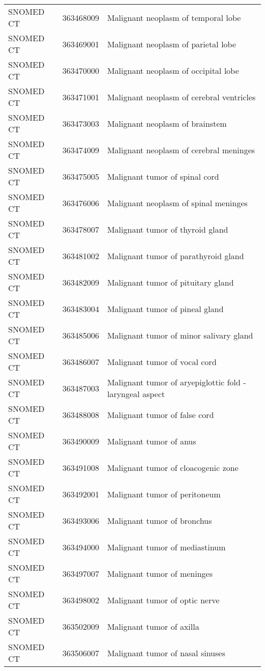 \begin{longtable}{p{}p{}p{}}
  SNOMED CT & 363468009 & Malignant neoplasm of temporal lobe \\ 
  SNOMED CT & 363469001 & Malignant neoplasm of parietal lobe \\ 
  SNOMED CT & 363470000 & Malignant neoplasm of occipital lobe \\ 
  SNOMED CT & 363471001 & Malignant neoplasm of cerebral ventricles \\ 
  SNOMED CT & 363473003 & Malignant neoplasm of brainstem \\ 
  SNOMED CT & 363474009 & Malignant neoplasm of cerebral meninges \\ 
  SNOMED CT & 363475005 & Malignant tumor of spinal cord \\ 
  SNOMED CT & 363476006 & Malignant neoplasm of spinal meninges \\ 
  SNOMED CT & 363478007 & Malignant tumor of thyroid gland \\ 
  SNOMED CT & 363481002 & Malignant tumor of parathyroid gland \\ 
  SNOMED CT & 363482009 & Malignant tumor of pituitary gland \\ 
  SNOMED CT & 363483004 & Malignant tumor of pineal gland \\ 
  SNOMED CT & 363485006 & Malignant tumor of minor salivary gland \\ 
  SNOMED CT & 363486007 & Malignant tumor of vocal cord \\ 
  SNOMED CT & 363487003 & Malignant tumor of aryepiglottic fold - laryngeal aspect \\ 
  SNOMED CT & 363488008 & Malignant tumor of false cord \\ 
  SNOMED CT & 363490009 & Malignant tumor of anus \\ 
  SNOMED CT & 363491008 & Malignant tumor of cloacogenic zone \\ 
  SNOMED CT & 363492001 & Malignant tumor of peritoneum \\ 
  SNOMED CT & 363493006 & Malignant tumor of bronchus \\ 
  SNOMED CT & 363494000 & Malignant tumor of mediastinum \\ 
  SNOMED CT & 363497007 & Malignant tumor of meninges \\ 
  SNOMED CT & 363498002 & Malignant tumor of optic nerve \\ 
  SNOMED CT & 363502009 & Malignant tumor of axilla \\ 
  SNOMED CT & 363506007 & Malignant tumor of nasal sinuses \\ 

\end{longtable}
